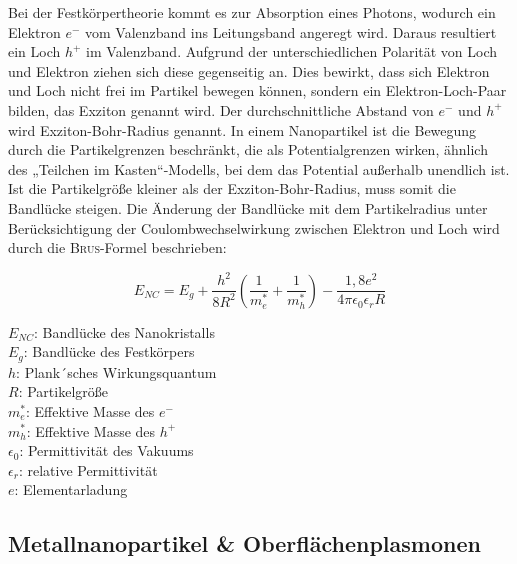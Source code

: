 	Bei der Festkörpertheorie kommt es zur Absorption eines Photons, wodurch ein Elektron $e^{-}$ vom Valenzband ins Leitungsband angeregt wird.
	Daraus resultiert ein Loch $h^{+}$  im Valenzband. 
	Aufgrund der unterschiedlichen Polarität von Loch und Elektron ziehen sich diese gegenseitig an. 
	Dies bewirkt, dass sich Elektron und Loch nicht frei im Partikel bewegen können, sondern ein Elektron-Loch-Paar bilden, das Exziton genannt wird. 
	Der durchschnittliche Abstand von $e^{-}$ und $h^{+}$ wird Exziton-Bohr-Radius genannt.
	In einem Nanopartikel ist die Bewegung durch die Partikelgrenzen beschränkt, die als Potentialgrenzen wirken, ähnlich des „Teilchen im Kasten“-Modells, bei dem das Potential außerhalb unendlich ist.
	Ist die Partikelgröße kleiner als der Exziton-Bohr-Radius, muss somit die Bandlücke steigen.
	Die Änderung der Bandlücke mit dem Partikelradius unter Berücksichtigung der  Coulombwechselwirkung zwischen Elektron und Loch wird durch die \textsc{Brus}-Formel beschrieben:\autocite{Brus1984}
	
	\begin{equation}
	\label{eq:BRUS}
	E_{NC}=E_{g}+\frac{h^{2}}{8R^{2}}\left( \frac{1}{m^{*}_{e}}+\frac{1}{m^{*}_{h}}\right)-\frac{1,8e^{2}}{4\pi\epsilon_{0}\epsilon_{r}R} 
	\end{equation}
	\begin{multicols}{2}
		\begin{flushleft}
			$E_{NC}$:	Bandlücke des Nanokristalls\\
			$E_{g}$:	Bandlücke des Festkörpers\\
			$h$:		Plank´sches Wirkungsquantum\\
			$R$:		Partikelgröße\\
			$m^{*}_{e}$: Effektive Masse des $e^{-}$\\
			$m^{*}_{h}$: Effektive Masse des $h^{+}$\\
			$\epsilon_{0}$: Permittivität des Vakuums\\
			$\epsilon_{r}$: relative Permittivität\\
			$e$: Elementarladung\\
		\end{flushleft}
	\end{multicols}
	

    \subsection{Metallnanopartikel \& Oberflächenplasmonen}
    
